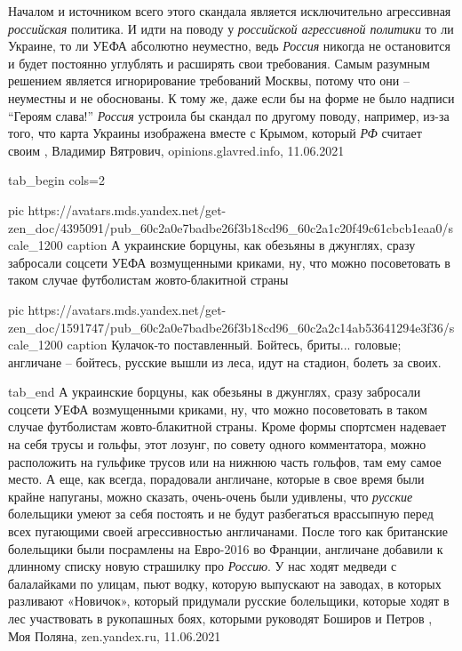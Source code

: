Началом и источником всего этого скандала является исключительно агрессивная
\emph{российская} политика. И идти на поводу у \emph{российской агрессивной политики} то ли
Украине, то ли УЕФА абсолютно неуместно, ведь \emph{Россия} никогда не остановится и
будет постоянно углублять и расширять свои требования. Самым разумным решением
является игнорирование требований Москвы, потому что они – неуместны и не
обоснованы. К тому же, даже если бы на форме не было надписи \enquote{Героям слава!}
\emph{Россия} устроила бы скандал по другому поводу, например, из-за того, что карта
Украины изображена вместе с Крымом, который \emph{РФ} считает своим
, 
Владимир Вятрович, opinions.glavred.info, 11.06.2021

\ifcmt
tab_begin cols=2

  pic https://avatars.mds.yandex.net/get-zen_doc/4395091/pub_60c2a0e7badbe26f3b18cd96_60c2a1c20f49c61cbcb1eaa0/scale_1200
  caption А украинские борцуны, как обезьяны в джунглях, сразу забросали соцсети УЕФА возмущенными криками, ну, что можно посоветовать в таком случае футболистам жовто-блакитной страны

  pic https://avatars.mds.yandex.net/get-zen_doc/1591747/pub_60c2a0e7badbe26f3b18cd96_60c2a2c14ab53641294e3f36/scale_1200
  caption Кулачок-то поставленный. Бойтесь, бриты... головые; англичане – бойтесь, русские вышли из леса, идут на стадион, болеть за своих.

tab_end
\fi
А украинские борцуны, как обезьяны в джунглях, сразу забросали соцсети УЕФА
возмущенными криками, ну, что можно посоветовать в таком случае футболистам
жовто-блакитной страны. Кроме формы спортсмен надевает на себя трусы и гольфы,
этот лозунг, по совету одного комментатора, можно расположить на гульфике
трусов или на нижнюю часть гольфов, там ему самое место.  А еще, как всегда,
порадовали англичане, которые в свое время были крайне напуганы, можно сказать,
очень-очень были удивлены, что \emph{русские} болельщики умеют за себя постоять
и не будут разбегаться врассыпную перед всех пугающими своей агрессивностью
англичанами. После того как британские болельщики были посрамлены на Евро-2016
во Франции, англичане добавили к длинному списку новую страшилку про
\emph{Россию}.  У нас ходят медведи с балалайками по улицам, пьют водку,
которую выпускают на заводах, в которых разливают «Новичок», который придумали
русские болельщики, которые ходят в лес участвовать в рукопашных боях, которыми
руководят Боширов и Петров
, 
Моя Поляна, zen.yandex.ru, 11.06.2021

